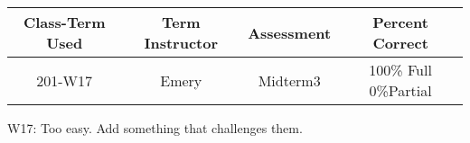 \begin{outcomes}
	\begin{center}
		\begin{tabular}{cccc}
			\hline\hline
			Class-Term Used & Term Instructor & Assessment & Percent Correct\\
			\hline
			201-W17 & Emery & Midterm3 & 100\% Full 0\%Partial \\
			\hline
		\end{tabular}
	\end{center}
\end{outcomes}

\begin{comments}

W17: Too easy. Add something that challenges them.


\end{comments}